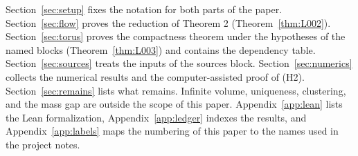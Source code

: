 Section~\ref{sec:setup} fixes the notation for both parts of the paper. Section~\ref{sec:flow} proves the reduction of Theorem 2 (Theorem~\ref{thm:L002}). Section~\ref{sec:torus} proves the compactness theorem under the hypotheses of the named blocks (Theorem~\ref{thm:L003}) and contains the dependency table. Section~\ref{sec:sources} treats the inputs of the sources block. Section~\ref{sec:numerics} collects the numerical results and the computer-assisted proof of (H2). Section~\ref{sec:remains} lists what remains. Infinite volume, uniqueness, clustering, and the mass gap are outside the scope of this paper. Appendix~\ref{app:lean} lists the Lean formalization, Appendix~\ref{app:ledger} indexes the results, and Appendix~\ref{app:labels} maps the numbering of this paper to the names used in the project notes.

